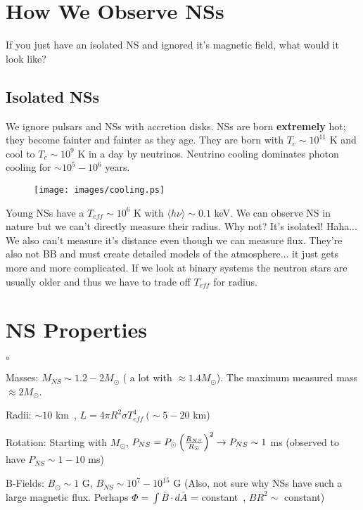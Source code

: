 \section{How We Observe NSs}
If you just have an isolated NS and ignored it's magnetic field, what would it look like? 
\subsection{Isolated NSs}
We ignore pulsars and NSs with accretion disks. NSs are born \textbf{extremely} hot; they become fainter and fainter as they age. They are born with $T_c \sim 10^{11}$ K and cool to $T_c \sim 10^9$ K in a day by neutrinos. Neutrino cooling dominates photon cooling for $\sim 10^5-10^6$ years. %

\begin{figure}[!ht]
\centering
\texttt{[image: images/cooling.ps]}
\label{fig:cooling}
\end{figure}

Young NSs have a $T_{eff} \sim 10^6$ K with $\langle h\nu\rangle \sim 0.1$ keV. We can observe NS in nature but we can't directly measure their radius. Why not? It's isolated! Haha... We also can't measure it's distance even though we can measure flux. They're also not BB and must create detailed models of the atmosphere... it just gets more and more complicated. If we look at binary systems the neutron stars are usually older and thus we have to trade off $T_{eff}$ for radius. 
\section{NS Properties}
\begin{list}{$\circ$}{}
\item Masses: $M_{NS} \sim 1.2 - 2M_\odot$ ( a lot with $\approx 1.4M_\odot$). The maximum measured mass $\approx 2 M_\odot$. 
\item Radii: $\sim 10$ km~, $L = 4 \pi R^2 \sigma T_{eff}^4 ~(\sim 5 - 20$ km)
\item Rotation: Starting with $M_\odot$, $P_{NS} = P_\odot \left( \frac{R_{NS}}{R_\odot} \right)^2 \rightarrow P_{NS} \sim 1$ ms (observed to have $P_{NS} \sim 1-10$ ms)
\item B-Fields: $B_\odot \sim 1$ G, $B_{NS} \sim 10^7-10^{15}$ G (Also, not sure why NSs have such a large magnetic flux. Perhaps $\Phi = \int \bar{B} \cdot d\bar{A}$ = constant~, $BR^2 \sim$ constant)
\end{list}